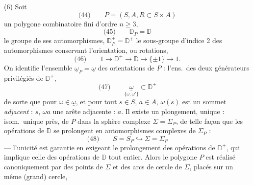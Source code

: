 \documentclass[11pt,a4paper]{article}
\begin{document}
(6) Soit
\[
  \text{(44)} \qquad P = (S, A, R \subset S \times A)
\]
un polygone combinatoire fini d'ordre $n \geq 3$,
\[
  \text{(45)} \qquad \mathbb{D}_P = \mathbb{D}
\]
le groupe de ses automorphismes, $\mathbb{D}_P^{+} = \mathbb{D}^{+}$ le sous-groupe
d'indice 2 des automorphismes conservant l'orientation, ou rotations,
\[
  \text{(46)} \qquad 1 \longrightarrow \mathbb{D}^{+} \longrightarrow \mathbb{D}
  \longrightarrow \{\pm 1\} \longrightarrow 1 .
\]
On identifie l'ensemble $\underline{\omega}_P = \underline{\omega}$ des
orientations de $P$ : l'ens.\ des deux générateurs privilégiés de $\mathbb{D}^{+}$,
\[
  \text{(47)} \qquad \underset{\{\omega, \omega'\}}{\underline{\omega}}
  \subset \mathbb{D}^{+}
\]
de sorte que pour $\omega \in \underline{\omega}$, et pour tout $s \in S$,
$a \in A$, $\omega(s)$ est un sommet \emph{adjacent} : $s$, $\omega a$ une arête
adjacente : $a$. Il existe un plongement, unique : isom.\ unique
\struck{\ill{}} près, de $P$ dans la sphère complexe $\Sigma = \Sigma_P$, de
telle façon que les opérations de $\mathbb{D}$ se prolongent en
automorphismes \struck{\ill{}} complexes de $\Sigma_P$ :
\[
  \text{(48)} \qquad S = S_P \hookrightarrow \Sigma = \Sigma_P
\]
--- l'unicité est  garantie en exigeant le prolongement des
opérations de $\mathbb{D}^{+}$, qui implique celle des opérations de $\mathbb{D}$
tout entier. Alors le polygone $P$ est réalisé canoniquement par des points de
$\Sigma$ et des arcs de  cercle de $\Sigma$, \struck{\ill{}}
  placés sur un même (grand) cercle,
\end{document}
